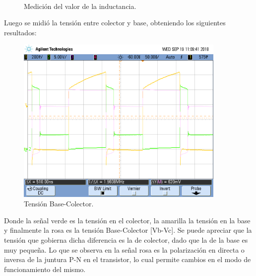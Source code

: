 \begin{figure}[H]
\\
\caption{Medición del valor de la inductancia.}
\label{fig:medL}
\end{figure}
Luego se midió la tensión entre colector y base, obteniendo los siguientes resultados:
\begin{figure}[H]
	\centering
	\includegraphics[width=0.9\textwidth]{Imagenes/vbc_vc_ab.png}
\caption{Tensión Base-Colector.}
	\label{fig:vbc}
\end{figure}
Donde la señal verde es la tensión en el colector, la amarilla la tensión en la base y finalmente la rosa es la tensión Base-Colector [Vb-Vc].
Se puede apreciar que la tensión que gobierna dicha diferencia es la de colector, dado que la de la base es muy pequeña. Lo que se observa en la señal rosa es la polarización en directa o inversa de la juntura P-N  en el transistor, lo cual permite cambios en el modo de funcionamiento del mismo.


